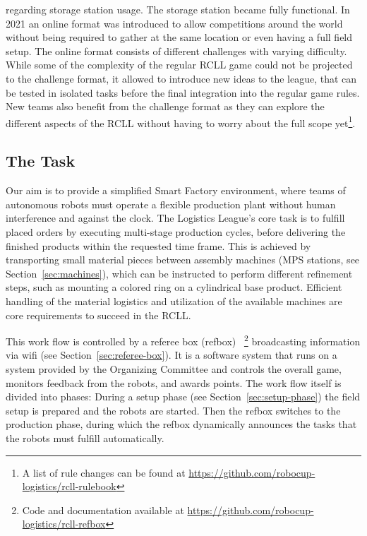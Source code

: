 \documentclass[12pt,twoside]{article}
\newcommand{\refsec}[1]{Section~\ref{#1}}
\begin{document}
 regarding storage station usage. The storage station became fully functional.
 In 2021 an online format was introduced to allow competitions around the
 world without being required to gather at the same location or even having
 a full field setup.
 The online format consists of different challenges with varying difficulty.
 While some of the complexity of the regular RCLL game could not be projected
 to the challenge format, it allowed to introduce new ideas to the league,
 that can be tested in isolated tasks before the final integration into
 the regular game rules.
 New teams also benefit from the challenge format as they can explore the
 different aspects of the RCLL without having to worry about the full scope
 yet\footnote{A list of rule changes can be found at
 \mbox{\url{https://github.com/robocup-logistics/rcll-rulebook}}}.

\subsection{The Task}
\label{sec:task}
 Our aim is to provide a simplified Smart Factory environment, where
 teams of autonomous robots must operate a flexible production plant without
 human interference and against the clock.
 The Logistics League's core task is to fulfill placed orders by
 executing multi-stage production cycles, before delivering the finished
 products within the requested time frame.
 This is achieved by transporting small material pieces between assembly
 machines (MPS stations, see \refsec{sec:machines}),
 which can be instructed to perform different refinement steps,
 such as mounting a colored ring on a cylindrical base product.
 Efficient handling of the material logistics and utilization of the available
 machines are core requirements to succeed in the \ac{RCLL}.

 This work flow is controlled by a referee box (refbox)~\cite{RCI-RefBox}%
\footnote{Code and documentation available at
\url{https://github.com/robocup-logistics/rcll-refbox}}
broadcasting information via wifi (see \refsec{sec:referee-box}).
It is a software system that runs on a
system provided by the Organizing Committee and controls the overall game,
monitors feedback from the robots, and awards points.
The work flow itself is divided into phases:
During a setup phase (see \refsec{sec:setup-phase})
the field setup is prepared and the robots are started.
Then the refbox switches to the production phase, during which the refbox
dynamically announces the tasks that the robots must fulfill automatically.
\end{document}
